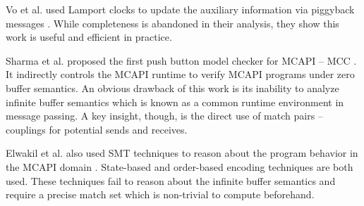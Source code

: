 Vo et al. used Lamport clocks to update the auxiliary information via piggyback messages \cite{DBLP:conf/sc/VoAGSSB10,DBLP:conf/IEEEpact/VoGKSSB11}. While completeness is abandoned in their analysis, they show this work is useful and efficient in practice. 

Sharma et al. proposed the first push button model checker for MCAPI -- MCC \cite{DBLP:conf/fmcad/SharmaGMH09}. It indirectly controls the MCAPI runtime to verify MCAPI programs under zero buffer semantics. An obvious drawback of this work is its inability to analyze infinite buffer semantics which is known as a common runtime environment in message passing. A key insight, though, is the direct use of match pairs -- couplings for potential sends and receives.

Elwakil et al. also used SMT techniques to reason about the program behavior in the MCAPI domain \cite{DBLP:conf/issta/ElwakilY10,DBLP:conf/atva/ElwakilYW10}. State-based and order-based encoding techniques are both used. These techniques fail to reason about the infinite buffer semantics and require a precise match set which is non-trivial to compute beforehand.

